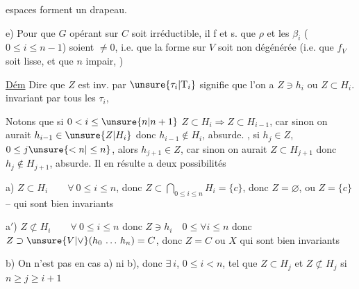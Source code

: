 
espaces forment un drapeau.

e) Pour que $G$ opérant sur $C$ soit irréductible, il f et s. que $\rho$ et les $\beta_i$ ($0\leq i\leq n-1$) soient $\ne0$, i.e. que  la forme   sur $V$ soit  non dégénérée (i.e. que $f_V$ soit lisse, et que   $n$ impair,  )


\uline{Dém} Dire que $Z$ est inv. par $\unsure{\tau_i|\mathrm T_i}$ signifie que l'on a $Z\ni h_i$ ou $Z\subset H_i$.   invariant par tous les $\tau_i$, 

Notons que si $0<i\leq\unsure{n|n+1}$ $Z\subset H_i\Longrightarrow Z\subset H_{i-1}$, car sinon on aurait $h_{i-1}\in\unsure{Z|H_i}$ donc $h_{i-1}\notin H_i$, absurde. , si $h_j\in Z$,  $0\leq j\unsure{<n|\leq n}$, alors $h_{j+1}\in Z$, car sinon on aurait $Z\subset H_{j+1}$ donc $h_j\notin H_{j+1}$, absurde. Il en résulte   a deux possibilités

a) $Z\subset H_i\qquad \forall\ 0\leq i\leq n$, donc $Z\subset\bigcap_{0\leq i\leq n}H_i=\{c\}$, donc $Z=\varnothing$, ou $Z=\{c\}$ -- qui sont bien invariants

a$'$) $Z\not\subset H_i\qquad \forall\ 0\leq i\leq n$ donc $Z\ni h_i\quad 0\leq\forall i\leq n$ donc $Z\supset\unsure{V|\vee}(h_0\,\ldots\,h_n)=C$, donc $Z=C$ ou $X$ qui sont bien invariants

b) On n'est pas en cas a) ni b), donc $\exists\ i$, $0\leq i<n$, tel que $Z\subset H_j$  et $Z\not\subset H_j$ si $n\geq j\geq i+1$


